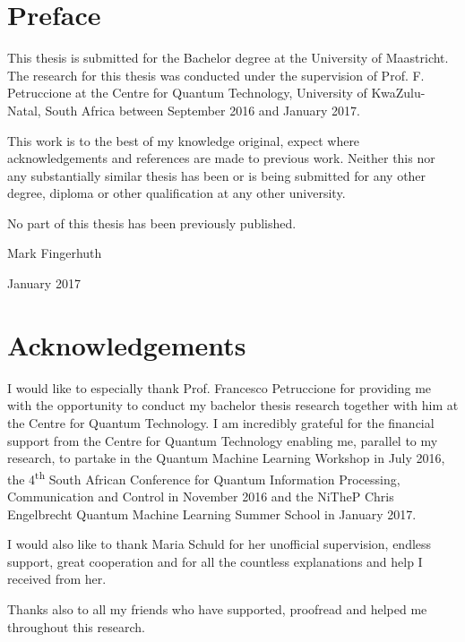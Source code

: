 
\chapter*{Preface}

This thesis is submitted for the Bachelor degree at the University of Maastricht. The research for this thesis was conducted under the supervision of Prof. F. Petruccione at the Centre for Quantum Technology, University of KwaZulu-Natal, South Africa between September 2016 and January 2017.

This work is to the best of my knowledge original, expect where acknowledgements and references are made to previous work. Neither this nor any substantially similar thesis has been or is being submitted for any other degree, diploma or other qualification at any other university.

No part of this thesis has been previously published.

\flushright
Mark Fingerhuth

January 2017
\justify
 \cleardoublepage
 
 
 \chapter*{Acknowledgements}

I would like to especially thank Prof. Francesco Petruccione for providing me with the opportunity to conduct my bachelor thesis research together with him at the Centre for Quantum Technology. I am incredibly grateful for the financial support from the Centre for Quantum Technology enabling me, parallel to my research, to partake in the Quantum Machine Learning Workshop in July 2016, the 4\textsuperscript{th} South African Conference for Quantum Information Processing, Communication and Control in November 2016 and the NiTheP Chris Engelbrecht Quantum Machine Learning Summer School in January 2017. 

I would also like to thank Maria Schuld for her unofficial supervision, endless support, great cooperation and for all the countless explanations and help I received from her.

Thanks also to all my friends who have supported, proofread and helped me throughout this research.

